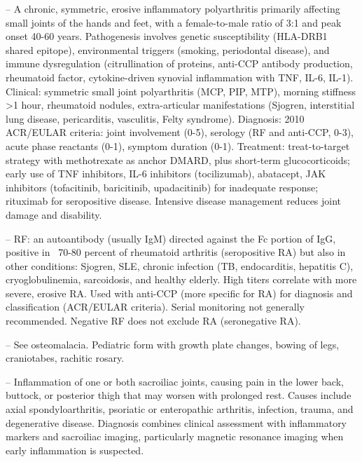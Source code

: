 -- A chronic, symmetric, erosive inflammatory polyarthritis primarily affecting small joints of the hands and feet, with a female-to-male ratio of 3:1 and peak onset 40-60 years. Pathogenesis involves genetic susceptibility (HLA-DRB1 shared epitope), environmental triggers (smoking, periodontal disease), and immune dysregulation (citrullination of proteins, anti-CCP antibody production, rheumatoid factor, cytokine-driven synovial inflammation with TNF, IL-6, IL-1). Clinical: symmetric small joint polyarthritis (MCP, PIP, MTP), morning stiffness >1 hour, rheumatoid nodules, extra-articular manifestations (Sjogren, interstitial lung disease, pericarditis, vasculitis, Felty syndrome). Diagnosis: 2010 ACR/EULAR criteria: joint involvement (0-5), serology (RF and anti-CCP, 0-3), acute phase reactants (0-1), symptom duration (0-1). Treatment: treat-to-target strategy with methotrexate as anchor DMARD, plus short-term glucocorticoids; early use of TNF inhibitors, IL-6 inhibitors (tocilizumab), abatacept, JAK inhibitors (tofacitinib, baricitinib, upadacitinib) for inadequate response; rituximab for seropositive disease. Intensive disease management reduces joint damage and disability.

-- RF: an autoantibody (usually IgM) directed against the Fc portion of IgG, positive in ~70-80 percent of rheumatoid arthritis (seropositive RA) but also in other conditions: Sjogren, SLE, chronic infection (TB, endocarditis, hepatitis C), cryoglobulinemia, sarcoidosis, and healthy elderly. High titers correlate with more severe, erosive RA. Used with anti-CCP (more specific for RA) for diagnosis and classification (ACR/EULAR criteria). Serial monitoring not generally recommended. Negative RF does not exclude RA (seronegative RA).

-- See osteomalacia. Pediatric form with growth plate changes, bowing of legs, craniotabes, rachitic rosary.

-- Inflammation of one or both sacroiliac joints, causing pain in the lower back, buttock, or posterior thigh that may worsen with prolonged rest. Causes include axial spondyloarthritis, psoriatic or enteropathic arthritis, infection, trauma, and degenerative disease. Diagnosis combines clinical assessment with inflammatory markers and sacroiliac imaging, particularly magnetic resonance imaging when early inflammation is suspected.

